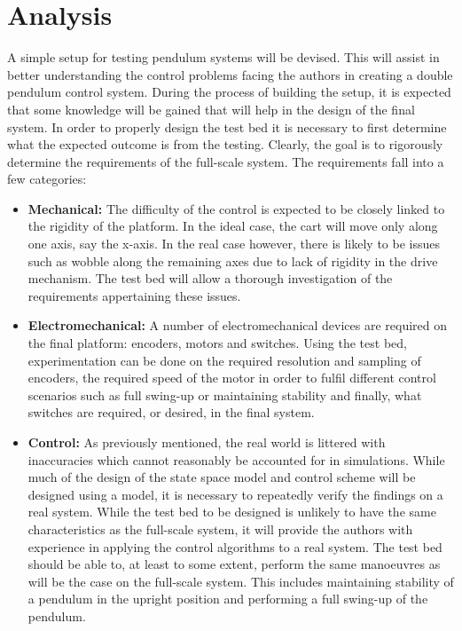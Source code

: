 
\section{Analysis}
\label{sec:analysis}
A simple setup for testing pendulum systems will be devised.
This will assist in better understanding the control problems facing the authors in creating a double pendulum control system.
During the process of building the setup, it is expected that some knowledge will be gained that will help in the design of the final system.
In order to properly design the test bed it is necessary to first determine what the expected outcome is from the testing.
Clearly, the goal is to rigorously determine the requirements of the full-scale system.
The requirements fall into a few categories:

\begin{itemize}
	\item \textbf{Mechanical:} The difficulty of the control is expected to be closely linked to the rigidity of the platform.
	In the ideal case, the cart will move only along one axis, say the x-axis.
	In the real case however, there is likely to be issues such as wobble along the remaining axes due to lack of rigidity in the drive mechanism.
	The test bed will allow a thorough investigation of the requirements appertaining these issues.
	\item \textbf{Electromechanical:} A number of electromechanical devices are required on the final platform: encoders, motors and switches.
	Using the test bed, experimentation can be done on the required resolution and sampling of encoders, the required speed of the motor in order to fulfil different control scenarios such as full swing-up or maintaining stability and finally, what switches are required, or desired, in the final system.
	\item \textbf{Control:} As previously mentioned, the real world is littered with inaccuracies which cannot reasonably be accounted for in simulations.
	While much of the design of the state space model and control scheme will be designed using a model, it is necessary to repeatedly verify the findings on a real system.
	While the test bed to be designed is unlikely to have the same characteristics as the full-scale system, it will provide the authors with experience in applying the control algorithms to a real system.
	The test bed should be able to, at least to some extent, perform the same manoeuvres as will be the case on the full-scale system.
	This includes maintaining stability of a pendulum in the upright position and performing a full swing-up of the pendulum.
\end{itemize}

